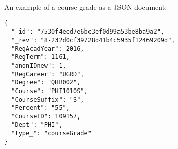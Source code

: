 An example of a course grade as a JSON document:

\begin{verbatim}
{
  "_id": "7530f4eed7e6bc3ef0d99a53be8ba9a2",
  "_rev": "8-232d0cf39728d41b4c5935f12469209d",
  "RegAcadYear": 2016,
  "RegTerm": 1161,
  "anonIDnew": 1,
  "RegCareer": "UGRD",
  "Degree": "QHB002",
  "Course": "PHI1010S",
  "CourseSuffix": "S",
  "Percent": "55",
  "CourseID": 109157,
  "Dept": "PHI",
  "type_": "courseGrade"
}
\end{verbatim}

\begin{table}[]
  \centering
  \label{Grades Columns}
  \caption{List of white-listed columns for the Course Grade entity: only these fields are used in the analysis.}
\end{table}

